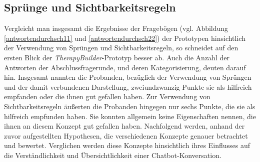 \subsection{Sprünge und Sichtbarkeitsregeln}
Vergleicht man insgesamt die Ergebnisse der Fragebögen (vgl. Abbildung \ref{antwortendurchsch11} und \ref{antwortendurchsch22}) der Prototypen hinsichtlich der Verwendung von Sprüngen und Sichtbarkeitsregeln, so schneidet auf den ersten Blick der \emph{TherapyBuilder}-Prototyp besser ab. Auch die Anzahl der Antworten  der Abschlussfragerunde, und deren Kategorisierung, deuten darauf hin. Insgesamt nannten die Probanden, bezüglich der Verwendung von Sprüngen und der damit verbundenen Darstellung, zweiundzwanzig Punkte sie als hilfreich empfanden oder die ihnen gut gefallen haben. Zur Verwendung von Sichtbarkeitsregeln äußerten die Probanden hingegen nur sechs Punkte, die sie als hilfreich empfunden haben. Sie konnten allgemein keine Eigenschaften nennen, die ihnen an diesem Konzept gut gefallen haben. Nachfolgend werden, anhand der zuvor aufgestellten Hypothesen, die verschiedenen Konzepte genauer betrachtet und bewertet. Verglichen werden diese Konzepte hinsichtlich ihres Einflusses auf die Verständlichkeit und Übersichtlichkeit einer Chatbot-Konversation.


